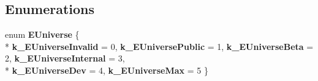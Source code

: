 \subsection*{Enumerations}
\begin{DoxyCompactItemize}
\item 
\hypertarget{namespaceValve_1_1Steamworks_a498395cc91a1c9e295c98188103538ea}{}enum {\bfseries E\+Universe} \{ \\*
{\bfseries k\+\_\+\+E\+Universe\+Invalid} = 0, 
{\bfseries k\+\_\+\+E\+Universe\+Public} = 1, 
{\bfseries k\+\_\+\+E\+Universe\+Beta} = 2, 
{\bfseries k\+\_\+\+E\+Universe\+Internal} = 3, 
\\*
{\bfseries k\+\_\+\+E\+Universe\+Dev} = 4, 
{\bfseries k\+\_\+\+E\+Universe\+Max} = 5
 \}\label{namespaceValve_1_1Steamworks_a498395cc91a1c9e295c98188103538ea}


\end{DoxyCompactItemize}
